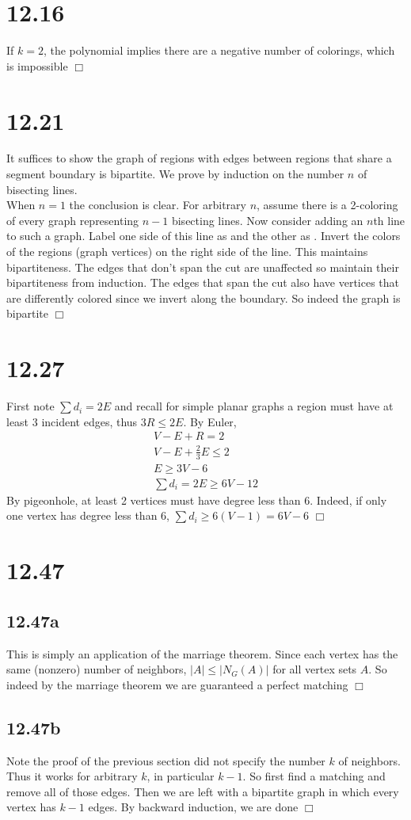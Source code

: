 \documentclass{article}
\begin{document}
\section*{12.16}
If $k = 2$, the polynomial implies there are a negative number of colorings, which is impossible $\Box$

\section*{12.21}
It suffices to show the graph of regions with edges between regions that share a segment boundary is bipartite. We prove by induction on the number $n$ of bisecting lines.\\
When $n = 1$ the conclusion is clear. For arbitrary $n$, assume there is a 2-coloring of every graph representing $n-1$ bisecting lines. Now consider adding an $n$th line to such a graph. Label one side of this line as  and the other as . Invert the colors of the regions (graph vertices) on the right side of the line. This maintains bipartiteness. The edges that don't span the cut are unaffected so maintain their bipartiteness from induction. The edges that span the cut also have vertices that are differently colored since we invert along the boundary. So indeed the graph is bipartite $\Box$

\section*{12.27}
First note $\sum d_i = 2E$ and recall for simple planar graphs a region must have at least 3 incident edges, thus $3R \leq 2E$. By Euler,
\begin{gather*}
V - E + R = 2\\
V - E + \frac{2}{3}E \leq 2\\
E \geq 3V - 6\\
\sum d_i = 2E \geq 6V - 12
\end{gather*}
By pigeonhole, at least 2 vertices must have degree less than 6. Indeed, if only one vertex has degree less than 6, $\sum d_i \geq 6(V-1) = 6V - 6$ $\Box$

\section*{12.47}
\subsection*{12.47a}
This is simply an application of the marriage theorem. Since each vertex has the same (nonzero) number of neighbors, $|A| \leq |N_G(A)|$ for all vertex sets $A$. So indeed by the marriage theorem we are guaranteed a perfect matching $\Box$

\subsection*{12.47b}
Note the proof of the previous section did not specify the number $k$ of neighbors. Thus it works for arbitrary $k$, in particular $k-1$. So first find a matching and remove all of those edges. Then we are left with a bipartite graph in which every vertex has $k-1$ edges. By backward induction, we are done $\Box$
\end{document}
